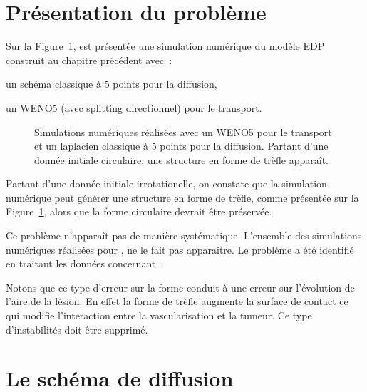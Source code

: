 \documentclass[main.tex]{subfiles}
\begin{document}
\section{Présentation du problème}
Sur la Figure~\ref{fig:trefle}, est présentée une simulation numérique du modèle EDP construit au chapitre précédent avec~:
\begin{myitemize}
\item un schéma classique à 5 points pour la diffusion,
\item un WENO5 (avec splitting directionnel) pour le transport.
\end{myitemize}
\begin{figure}
\centering
\caption{\label{fig:trefle} Simulations numériques réalisées avec un WENO5 pour le transport et un laplacien classique à 5 points pour la diffusion. Partant d'une donnée initiale circulaire, 
une structure en forme de trèfle apparaît.}
\end{figure}
Partant d'une donnée initiale irrotationelle, on constate que la simulation numérique peut générer une structure en forme de trèfle, comme présentée  sur la Figure~\ref{fig:trefle}, alors que la forme circulaire devrait être préservée. 

Ce problème n'apparaît pas de manière systématique. L'ensemble des simulations numériques réalisées pour \Nber, ne le fait pas apparaître. Le problème a été identifié en traitant les données concernant~\Chen. 


Notons que ce type d'erreur sur la forme conduit à une erreur sur l'évolution de l'aire de la lésion. En effet la forme de trèfle augmente la surface de contact ce qui modifie l'interaction entre la vascularisation et la tumeur. Ce type d'instabilités doit être supprimé.


\section{Le schéma de diffusion}
\end{document}
